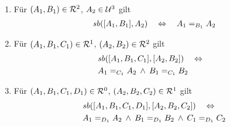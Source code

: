    \begin{satz}\ \vspace{0pt}

        \begin{enumerate}
            \item Für $(A_1,B_1) \in \mathcal{R}^2$, $A_2 \in \mathcal{U}^3$ gilt 
                \begin{align*}
                    \mathit{sb}([A_1,B_1],A_2) 
                    \quad \Leftrightarrow \quad 
                    A_1 =_{B_1} A_2
                \end{align*}
            \item Für $(A_1,B_1,C_1) \in \mathcal{R}^1$, $(A_2,B_2) \in \mathcal{R}^2$ gilt 
                \begin{align*}
                    &\mathit{sb}([A_1,B_1,C_1],[A_2,B_2]) 
                    \quad \Leftrightarrow \quad\\
                    &A_1 =_{C_1} A_2 \:\land\: B_1 =_{C_1} B_2
                \end{align*}
            \item Für $(A_1,B_1,C_1,D_1) \in \mathcal{R}^0$, $(A_2,B_2,C_2) \in \mathcal{R}^1$ gilt 
                \begin{align*}
                    &\mathit{sb}([A_1,B_1,C_1,D_1],[A_2,B_2,C_2]) 
                    \quad \Leftrightarrow \quad\\ 
                    &A_1 =_{D_1} A_2 \:\land\: B_1 =_{D_1} B_2 \:\land\: C_1 =_{D_1} C_2
                \end{align*}
        \end{enumerate}
        
    \end{satz}
    
